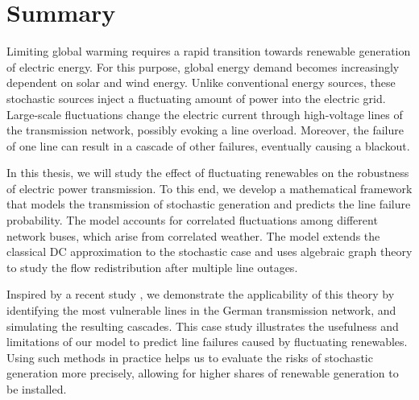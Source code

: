 \documentclass{report}
\title{\thesistitle}
\author{\thesisauthorfirst\space\thesisauthorsecond}
\date{\thesisdate}
\theoremstyle{definition}
\theoremstyle{remark}
\begin{document}



\chapter*{Summary}
\vspace{1cm}
Limiting global warming requires a rapid transition towards renewable generation of electric energy. For this purpose, global energy demand becomes increasingly dependent on solar and wind energy. Unlike conventional energy sources, these stochastic sources inject a fluctuating amount of power into the electric grid. Large-scale fluctuations change the electric current through high-voltage lines of the transmission network, possibly evoking a line overload. Moreover, the failure of one line can result in a cascade of other failures, eventually causing a blackout. 

In this thesis, we will study the effect of fluctuating renewables on the robustness of electric power transmission. To this end, we develop a mathematical framework that models the transmission of stochastic generation and predicts the line failure probability. The model accounts for correlated fluctuations among different network buses, which arise from correlated weather. The model extends the classical DC approximation to the stochastic case and uses algebraic graph theory to study the flow redistribution after multiple line outages.

Inspired by a recent study \citep{Nesti2018emergentfailures}, we demonstrate the applicability of this theory by identifying the most vulnerable lines in the German transmission network, and simulating the resulting cascades. This case study illustrates the usefulness and limitations of our model to predict line failures caused by fluctuating renewables. Using such methods in practice helps us to evaluate the risks of stochastic generation more precisely, allowing for higher shares of renewable generation to be installed.
\end{document}
